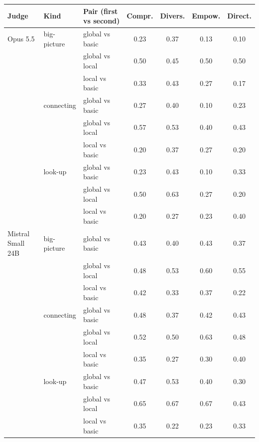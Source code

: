 \begin{tabular}{lllcccc}
\toprule
Judge & Kind & Pair (first vs second) & Compr. & Divers. & Empow. & Direct. \\
\midrule
Opus 5.5 & big-picture & global vs basic & 0.23 & 0.37 & 0.13 & 0.10 \\
 &  & global vs local & 0.50 & 0.45 & 0.50 & 0.50 \\
 &  & local vs basic & 0.33 & 0.43 & 0.27 & 0.17 \\
 & connecting & global vs basic & 0.27 & 0.40 & 0.10 & 0.23 \\
 &  & global vs local & 0.57 & 0.53 & 0.40 & 0.43 \\
 &  & local vs basic & 0.20 & 0.37 & 0.27 & 0.20 \\
 & look-up & global vs basic & 0.23 & 0.43 & 0.10 & 0.33 \\
 &  & global vs local & 0.50 & 0.63 & 0.27 & 0.20 \\
 &  & local vs basic & 0.20 & 0.27 & 0.23 & 0.40 \\
Mistral Small 24B & big-picture & global vs basic & 0.43 & 0.40 & 0.43 & 0.37 \\
 &  & global vs local & 0.48 & 0.53 & 0.60 & 0.55 \\
 &  & local vs basic & 0.42 & 0.33 & 0.37 & 0.22 \\
 & connecting & global vs basic & 0.48 & 0.37 & 0.42 & 0.43 \\
 &  & global vs local & 0.52 & 0.50 & 0.63 & 0.48 \\
 &  & local vs basic & 0.35 & 0.27 & 0.30 & 0.40 \\
 & look-up & global vs basic & 0.47 & 0.53 & 0.40 & 0.30 \\
 &  & global vs local & 0.65 & 0.67 & 0.67 & 0.43 \\
 &  & local vs basic & 0.35 & 0.22 & 0.23 & 0.33 \\
\bottomrule
\end{tabular}
